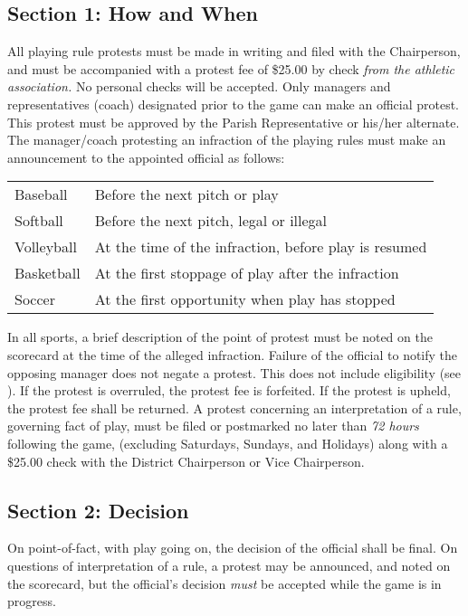 \subsection{Section 1: How and When}
\label{ssec:const-7-1}
All playing rule protests must be made in writing and filed with the Chairperson, and must be accompanied with a protest fee of \$25.00 by check {\em from the athletic association.} No personal checks will be accepted.  Only managers and representatives (coach) designated prior to the game can make an official protest.  This protest must be approved by the Parish Representative or his/her alternate.
The manager/coach protesting an infraction of the playing rules must make an announcement to the appointed official as follows:
\begin{center}
    \begin{tabular}{l l}
        Baseball & Before the next pitch or play\footnotemark[2] \\
        Softball & Before the next pitch, legal or illegal\footnotemark[2] \\
        Volleyball & At the time of the infraction, before play is resumed \\
        Basketball & At the first stoppage of play after the infraction \\
        Soccer & At the first opportunity when play has stopped \\
    \end{tabular}
\end{center}

In all sports, a brief description of the point of protest must be noted on the scorecard at the time of the alleged infraction.  Failure of the official to notify the opposing manager does not negate a protest.   This does not include eligibility (see ).  If the protest is overruled, the protest fee is forfeited. If the protest is upheld, the protest fee shall be returned. A protest concerning an interpretation of a rule, governing fact of play, must be filed or postmarked no later than {\em 72 hours} following the game, (excluding Saturdays, Sundays, and Holidays) along with a \$25.00 check with the District Chairperson or Vice Chairperson.

\subsection{Section 2: Decision}
\label{ssec:const-7-2}
On point-of-fact, with play going on, the decision of the official shall be final.  On questions of interpretation of a rule, a protest may be announced, and noted on the scorecard, but the official's decision {\em must} be accepted while the game is in progress.

